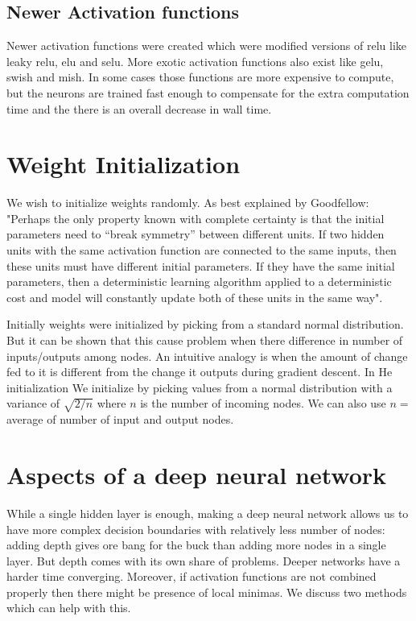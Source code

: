 \subsection{Newer Activation functions}
Newer activation functions were created which were modified versions of relu like leaky relu, elu and selu. More exotic activation functions also exist like gelu, swish and mish. In some cases those functions are more expensive to compute, but the neurons are trained fast enough to compensate for the extra computation time and the there is an overall decrease in wall time.
\section{Weight Initialization}
We wish to initialize weights randomly. As best explained by Goodfellow\citep{goodfellow2016deep}: "Perhaps the only property known with complete certainty is that the initial parameters need to “break symmetry” between different units. If two hidden units with the same activation function are connected to the same inputs, then these units must have different initial parameters. If they have the same initial parameters, then a deterministic learning algorithm applied to a deterministic cost and model will constantly update both of these units in the same way".

Initially weights were initialized by picking from a standard normal
distribution. But it can be shown that this cause problem when there difference in number of inputs/outputs among nodes. An intuitive analogy is when the amount of change fed to it is different from the change it outputs during gradient descent. In He initialization We initialize by picking values from a normal distribution with a variance of $\sqrt{2/n}$ where $n$ is the number of incoming nodes. We can also use $n=$average of number of input and output nodes. 

\section{Aspects of a deep neural network} While a single hidden layer is enough,
making a deep neural network allows us to
have more complex decision boundaries
with relatively less number of nodes: adding depth gives
ore bang for the buck than adding more nodes in a single layer. But depth
comes with its own share of problems. Deeper networks have a harder time converging. Moreover, if activation functions are not combined properly then there might be
presence of local minimas. We discuss two methods which can help with this.
